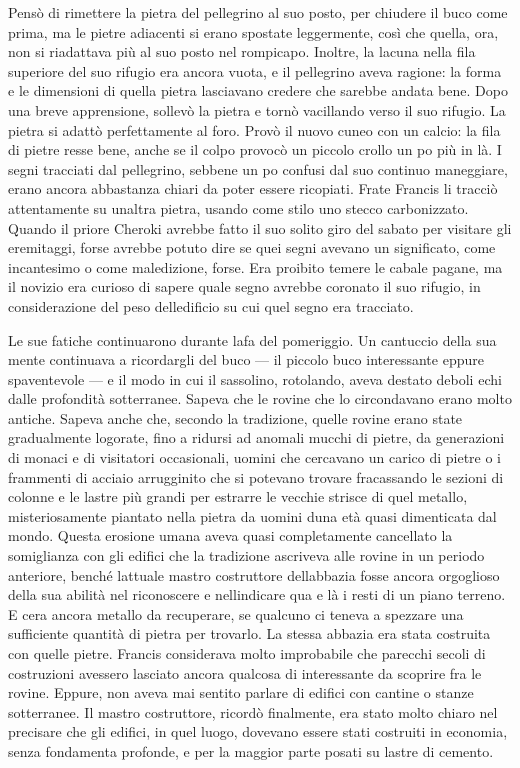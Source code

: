 Pensò di rimettere la pietra del pellegrino al suo posto, per chiudere
il buco come prima, ma le pietre adiacenti si erano spostate
leggermente, così che quella, ora, non si riadattava più al suo posto
nel rompicapo. Inoltre, la lacuna nella fila superiore del suo rifugio
era ancora vuota, e il pellegrino aveva ragione: la forma e le
dimensioni di quella pietra lasciavano credere che sarebbe andata bene.
Dopo una breve apprensione, sollevò la pietra e tornò vacillando verso
il suo rifugio. La pietra si adattò perfettamente al foro. Provò il
nuovo cuneo con un calcio: la fila di pietre resse bene, anche se il
colpo provocò un piccolo crollo un po\textquotesingle{} più in là. I
segni tracciati dal pellegrino, sebbene un po\textquotesingle{} confusi
dal suo continuo maneggiare, erano ancora abbastanza chiari da poter
essere ricopiati. Frate Francis li tracciò attentamente su
un\textquotesingle altra pietra, usando come stilo uno stecco
carbonizzato. Quando il priore Cheroki avrebbe fatto il suo solito giro
del sabato per visitare gli eremitaggi, forse avrebbe potuto dire se
quei segni avevano un significato, come incantesimo o come maledizione,
forse. Era proibito temere le cabale pagane, ma il novizio era curioso
di sapere quale segno avrebbe coronato il suo rifugio, in considerazione
del peso dell\textquotesingle edificio su cui quel segno era tracciato.

Le sue fatiche continuarono durante l\textquotesingle afa del
pomeriggio. Un cantuccio della sua mente continuava a ricordargli del
buco --- il piccolo buco interessante eppure spaventevole --- e il modo
in cui il sassolino, rotolando, aveva destato deboli echi dalle
profondità sotterranee. Sapeva che le rovine che lo circondavano erano
molto antiche. Sapeva anche che, secondo la tradizione, quelle rovine
erano state gradualmente logorate, fino a ridursi ad anomali mucchi di
pietre, da generazioni di monaci e di visitatori occasionali, uomini che
cercavano un carico di pietre o i frammenti di acciaio arrugginito che
si potevano trovare fracassando le sezioni di colonne e le lastre più
grandi per estrarre le vecchie strisce di quel metallo, misteriosamente
piantato nella pietra da uomini d\textquotesingle una età quasi
dimenticata dal mondo. Questa erosione umana aveva quasi completamente
cancellato la somiglianza con gli edifici che la tradizione ascriveva
alle rovine in un periodo anteriore, benché l\textquotesingle attuale
mastro costruttore dell\textquotesingle abbazia fosse ancora orgoglioso
della sua abilità nel riconoscere e nell\textquotesingle indicare qua e
là i resti di un piano terreno. E c\textquotesingle era ancora metallo
da recuperare, se qualcuno ci teneva a spezzare una sufficiente quantità
di pietra per trovarlo. La stessa abbazia era stata costruita con quelle
pietre. Francis considerava molto improbabile che parecchi secoli di
costruzioni avessero lasciato ancora qualcosa di interessante da
scoprire fra le rovine. Eppure, non aveva mai sentito parlare di edifici
con cantine o stanze sotterranee. Il mastro costruttore, ricordò
finalmente, era stato molto chiaro nel precisare che gli edifici, in
quel luogo, dovevano essere stati costruiti in economia, senza
fondamenta profonde, e per la maggior parte posati su lastre di cemento.

